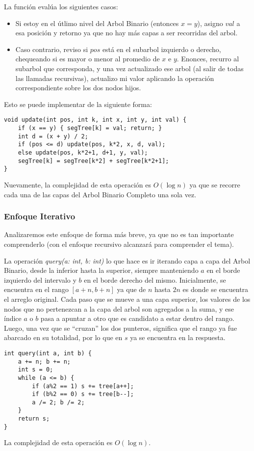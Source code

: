 \documentclass{article}
\begin{document}
La función evalúa los siguientes casos:
\begin{itemize}
    \item Si estoy en el útlimo nivel del Arbol Binario (entonces $x=y$), asigno $val$ a esa posición y retorno ya que no hay más capas a ser recorridas del arbol.
    \item Caso contrario, reviso si $pos$ está en el subarbol izquierdo o derecho, chequeando si es mayor o menor al promedio de $x$ e $y$. Enonces, recurro al subarbol que corresponda, y una vez actualizado ese arbol (al salir de todas las llamadas recursivas), actualizo mi valor aplicando la operación correspondiente sobre los dos nodos hijos.
\end{itemize}
Esto se puede implementar de la siguiente forma:
\begin{verbatim}
void update(int pos, int k, int x, int y, int val) {
    if (x == y) { segTree[k] = val; return; }
    int d = (x + y) / 2;
    if (pos <= d) update(pos, k*2, x, d, val);
    else update(pos, k*2+1, d+1, y, val);
    segTree[k] = segTree[k*2] + segTree[k*2+1];
}
\end{verbatim}
Nuevamente, la complejidad de esta operación es $O(\log n)$ ya que se recorre cada una de las capas del Arbol Binario Completo una sola vez.

\subsubsection{Enfoque Iterativo}

Analizaremos este enfoque de forma más breve, ya que no es tan importante comprenderlo (con el enfoque recursivo alcanzará para comprender el tema). 

La operación \textit{query(a: int, b: int)} lo que hace es ir iterando capa a capa del Arbol Binario, desde la inferior hasta la superior, siempre manteniendo $a$ en el borde izquierdo del intervalo y $b$ en el borde derecho del mismo. Inicialmente, se encuentra en el rango $[a+n, b+n]$ ya que de $n$ hasta $2n$  es donde se encuentra el arreglo original. Cada paso que se mueve a una capa superior, los valores de los nodos que no pertenezcan a la capa del arbol son agregados a la suma, y ese índice $a$ o $b$ pasa a apuntar a otro que es candidato a estar dentro del rango. Luego, una vez que se  ``cruzan'' los dos punteros, significa que el rango ya fue abarcado en su totalidad, por lo que en $s$ ya se encuentra en la respuesta.

\begin{verbatim}
int query(int a, int b) {
    a += n; b += n;
    int s = 0;
    while (a <= b) {
        if (a%2 == 1) s += tree[a++];
        if (b%2 == 0) s += tree[b--];
        a /= 2; b /= 2;
    }
    return s;
}
\end{verbatim}
La complejidad de esta operación es $O(\log n)$.
\end{document}
